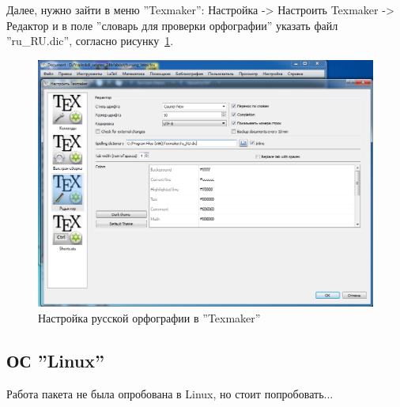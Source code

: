 Далее, нужно зайти в меню ''Texmaker'': Настройка -> Настроить Texmaker -> Редактор и в поле ''словарь для проверки орфографии'' указать файл ''ru\_RU.dic'', согласно рисунку~\ref{p:Texmaker}.

\begin{figure}[H]\center
  \captionsetup{singlelinecheck=true} %
  \includegraphics*[scale=0.47]{./about/Texmaker}
  \caption{Настройка русской орфографии в ''Texmaker''} \label{p:Texmaker}
\end{figure}




\subsection{ОС ''Linux''}

Работа пакета не была опробована в Linux, но стоит попробовать...






